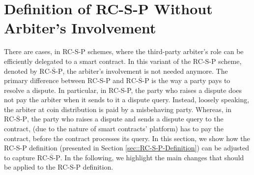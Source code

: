 
\section{Definition of RC-S-P Without Arbiter's Involvement}\label{sec::RC-S-P-Definition2}
There are cases, in RC-S-P schemes, where the third-party arbiter's role  can be  efficiently delegated to a smart contract.  In this variant of the RC-S-P scheme, denoted by ${\text{RC-}\overline{\text{S}}\text{-P}}$, the arbiter's involvement is not needed anymore. The primary difference between RC-S-P and ${\text{RC-}\overline{\text{S}}\text{-P}}$ is the way a party pays to resolve a dispute. In particular, in RC-S-P, the party who raises a dispute does not pay the arbiter when it sends to it a dispute query. Instead, loosely speaking, the arbiter at coin distribution is paid by a misbehaving party. Whereas, in ${\text{RC-}\overline{\text{S}}\text{-P}}$, the party who raises a dispute and sends a dispute query to the contract, (due to the nature of smart contracts' platform) has to pay the contract, before the contract processes its query.  In this section, we show how the RC-S-P definition (presented in Section \ref{sec::RC-S-P-Definition}) can be  adjusted to  capture ${\text{RC-}\overline{\text{S}}\text{-P}}$. In the following, we highlight the main changes that should be applied to the RC-S-P definition. 

